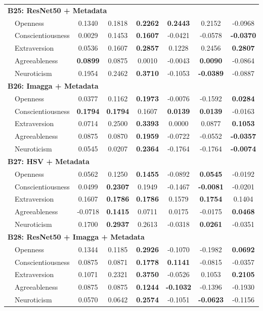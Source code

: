 \begin{longtable}{llcccccc}
\hline
\multicolumn{8}{l}{\textbf{B25: ResNet50 + Metadata}} \\
& Openness & 0.1340 & 0.1818 & \textbf{0.2262} & \textbf{0.2443} & 0.2152 & -0.0968 \\
& Conscientiousness & 0.0029 & 0.1453 & \textbf{0.1607} & -0.0421 & -0.0578 & \textbf{-0.0370} \\
& Extraversion & 0.0536 & 0.1607 & \textbf{0.2857} & 0.1228 & 0.2456 & \textbf{0.2807} \\
& Agreeableness & \textbf{0.0899} & 0.0875 & 0.0010 & -0.0043 & \textbf{0.0090} & -0.0864 \\
& Neuroticism & 0.1954 & 0.2462 & \textbf{0.3710} & -0.1053 & \textbf{-0.0389} & -0.0887 \\

\hline
\multicolumn{8}{l}{\textbf{B26: Imagga + Metadata}} \\
& Openness & 0.0377 & 0.1162 & \textbf{0.1973} & -0.0076 & -0.1592 & \textbf{0.0284} \\
& Conscientiousness & \textbf{0.1794} & \textbf{0.1794} & 0.1607 & \textbf{0.0139} & \textbf{0.0139} & -0.0163 \\
& Extraversion & 0.0714 & 0.2500 & \textbf{0.3393} & 0.0000 & 0.0877 & \textbf{0.1053} \\
& Agreeableness & 0.0875 & 0.0870 & \textbf{0.1959} & -0.0722 & -0.0552 & \textbf{-0.0357} \\
& Neuroticism & 0.0545 & 0.0207 & \textbf{0.2364} & -0.1764 & -0.1764 & \textbf{-0.0074} \\

\hline
\multicolumn{8}{l}{\textbf{B27: HSV + Metadata}} \\
& Openness & 0.0562 & 0.1250 & \textbf{0.1455} & -0.0892 & \textbf{0.0545} & -0.0192 \\
& Conscientiousness & 0.0499 & \textbf{0.2307} & 0.1949 & -0.1467 & \textbf{-0.0081} & -0.0201 \\
& Extraversion & 0.1607 & \textbf{0.1786} & \textbf{0.1786} & 0.1579 & \textbf{0.1754} & 0.1404 \\
& Agreeableness & -0.0718 & \textbf{0.1415} & 0.0711 & 0.0175 & -0.0175 & \textbf{0.0468} \\
& Neuroticism & 0.1700 & \textbf{0.2937} & 0.2613 & -0.0318 & \textbf{0.0261} & -0.0351 \\

\hline
\multicolumn{8}{l}{\textbf{B28: ResNet50 + Imagga + Metadata}} \\
& Openness & 0.1344 & 0.1185 & \textbf{0.2926} & -0.1070 & -0.1982 & \textbf{0.0692} \\
& Conscientiousness & 0.0875 & 0.0871 & \textbf{0.1778} & \textbf{0.1141} & -0.0815 & -0.0357 \\
& Extraversion & 0.1071 & 0.2321 & \textbf{0.3750} & -0.0526 & 0.1053 & \textbf{0.2105} \\
& Agreeableness & 0.0875 & 0.0875 & \textbf{0.1244} & \textbf{-0.1032} & -0.1396 & -0.1930 \\
& Neuroticism & 0.0570 & 0.0642 & \textbf{0.2574} & -0.1051 & \textbf{-0.0623} & -0.1156 \\


\end{longtable}
